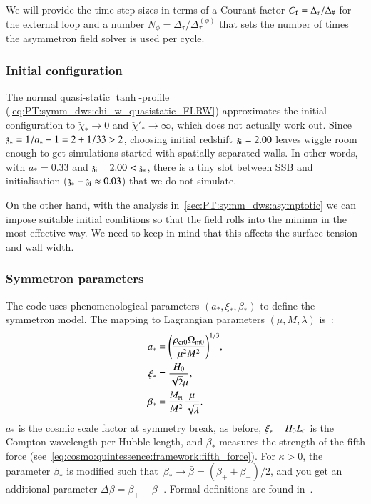     We will provide the time step sizes %
    in terms of a Courant factor $C_\mathrm{f}=\Delta_\tau/\Delta_\#$ for the external loop and a number $N_\phi=\Delta_\tau/\Delta_\tau^{(\phi)}$ that sets the number of times the asymmetron field solver is used per cycle. 

\subsubsection{Initial configuration}

    The normal quasi-static $\tanh$-profile (\cref{eq:PT:symm_dws:chi_w_quasistatic_FLRW}) approximates the initial configuration to $\breve{\chi}_\ast\to0$ and $\breve{\chi}'_\ast \to \infty$, which does not actually work out. %
    Since $\mathfrak{z}_\ast=1/a_\ast-1 = 2 + 1/33 > 2$, choosing initial redshift $\mathfrak{z}_\mathrm{i}=2.00$ leaves wiggle room enough to get simulations started with spatially separated walls. In other words, with $a_\ast=0.33$ and $\mathfrak{z}_\mathrm{i}=2.00< \mathfrak{z}_\ast$, there is a tiny slot between SSB and initialisation ($\mathfrak{z}_\ast-\mathfrak{z}_\mathrm{i} \approx 0.03$) that we do not simulate.
    
    On the other hand, with the analysis in~\cref{sec:PT:symm_dws:asymptotic} we can impose suitable initial conditions so that the field rolls into the minima in the most effective way. We need to keep in mind that this affects the surface tension and wall width.



\subsubsection{Symmetron parameters}
    The code uses phenomenological parameters $(a_\ast, \xi_\ast, \beta_\ast)$ to define the symmetron model. The mapping to Lagrangian parameters $(\mu, M, \lambda)$ is~\citep{christiansenAsevolutionRelativisticNbody2023}:
    \begin{subequations}\label{eq:PT:sims:mapping_symmetron_params}
        \begin{align}
            a_\ast &=  {\left( \frac{\rho_\mathrm{cr0} \Omega_\mathrm{m0}}{\mu^2 M^2} \right)}^{1/3},\\
            \xi_\ast &= \frac{H_0}{\sqrt{2}\mu}, \\
            \beta_\ast &=\frac{M_{\text{\tiny{Pl}}}}{M^2} \frac{\mu}{\sqrt{\lambda}}.
        \end{align}
    \end{subequations}
    $a_\ast$ is the cosmic scale factor at symmetry break, as before, $\xi_\ast= H_0 L_{\text{\tiny{C}}}$ is the Compton wavelength per Hubble length, and $\beta_\ast$ measures the strength of the fifth force (see~\cref{eq:cosmo:quintessence:framework:fifth_force}). %
    For $\kappa>0$, the parameter $\beta_\ast$ is modified such that~$\beta_\ast \to \bar{\beta}= (\beta_+ + \beta_-)/2$, and you get an additional parameter $\Delta \beta = \beta_+- \beta_-$. Formal definitions are found in~\citet{christiansenAsevolutionRelativisticNbody2023}. %



